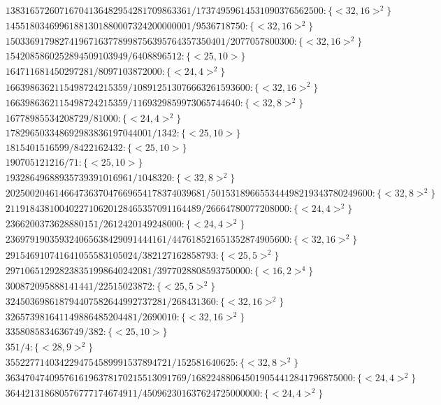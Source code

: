 \documentclass[11pt,reqno]{amsart}
\theoremstyle{plain}
\theoremstyle{definition}
\begin{document}
{\begin{align*}
&13831657260716704136482954281709863361/17374959614531090376562500:\{ <32, 16>^2 \}\\
&14551803469961881301880007324200000001/9536718750:\{ <32, 16>^2 \}\\
&150336917982741967163778998756395764357350401/2077057800300:\{ <32, 16>^2 \}\\
&1542085860252894509103949/6408896512:\{ <25, 10> \}\\
&164711681450297281/8097103872000:\{ <24, 4>^2 \}\\
&1663986362115498724215359/108912513076663261593600:\{ <32, 16>^2 \}\\
&1663986362115498724215359/1169329859973065744640:\{ <32, 8>^2 \}\\
&16778985534208729/81000:\{ <24, 4>^2 \}\\
&178296503348692983836197044001/1342:\{ <25, 10> \}\\
&1815401516599/8422162432:\{ <25, 10> \}\\
&190705121216/71:\{ <25, 10> \}\\
&19328649688935739391016961/1048320:\{ <32, 8>^2 \}\\
&20250020461466473637047669654178374039681/501531896655344498219343780249600:\{ <32, 8>^2 \}\\
&2119184381004022710620128465357091164489/26664780077208000:\{ <24, 4>^2 \}\\
&2366200373628880151/2612420149248000:\{ <24, 4>^2 \}\\
&236979190359324065638429091444161/447618521651352874905600:\{ <32, 16>^2 \}\\
&291546910741641055583105024/382127162858793:\{ <25, 5>^2 \}\\
&297106512928238351998640242081/3977028808593750000:\{ <16, 2>^4 \}\\
&300872095888141441/22515023872:\{ <25, 5>^2 \}\\
&324503698618794407582644992737281/268431360:\{ <32, 16>^2 \}\\
&326573981641149886485204481/2690010:\{ <32, 16>^2 \}\\
&3358085834636749/382:\{ <25, 10> \}\\
&351/4:\{ <28, 9>^2 \}\\
&3552277140342294754589991537894721/152581640625:\{ <32, 8>^2 \}\\
&3634704740957616196378170215513091769/168224880645019054412841796875000:\{ <24, 4>^2 \}\\
&364421318680576777174674911/450962301637624725000000:\{ <24, 4>^2 \}\\

\end{align*}}
\end{document}
